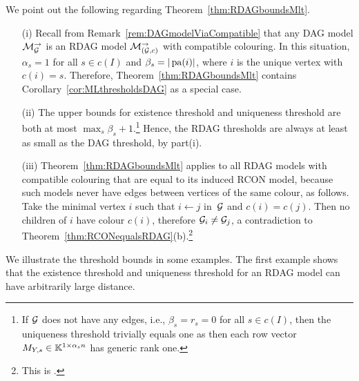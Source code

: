 \begin{remark} We point out the following regarding Theorem~\ref{thm:RDAGboundsMlt}.
	\begin{itemize}
		\item[(i)] Recall from Remark~\ref{rem:DAGmodelViaCompatible} that any DAG model $\mathcal{M}_{\mathcal{G}}^{\to}$ is an RDAG model $\mathcal{M}_{(\mathcal{G}, c)}^{\to}$ with compatible colouring. In this situation, $\alpha_s = 1$ for all $s \in c(I)$ and $\beta_s = |\operatorname{pa}(i)|$, where $i$ is the unique vertex with $c(i) = s$. Therefore, Theorem~\ref{thm:RDAGboundsMlt} contains Corollary~\ref{cor:MLthresholdsDAG} as a special case.
		
		\item[(ii)] The upper bounds for existence threshold and uniqueness threshold are both at most $\max_s \beta_s +1$.\footnote{If $\mathcal{G}$ does not have any edges, i.e., $\beta_s = r_s = 0$ for all $s \in c(I)$, then the uniqueness threshold trivially equals one as then each row vector $M_{Y,s} \in \mathbb K^{1 \times \alpha_s n}$ has generic rank one.} Hence, the RDAG thresholds are always at least as small as the DAG threshold, by part(i).
		
		\item[(iii)] \label{rmk:no_edges_same_colour}
		Theorem~\ref{thm:RDAGboundsMlt} applies to all RDAG models with compatible colouring that are equal to its induced RCON model, because such models never have edges between vertices of the same colour, as follows.
		Take the minimal vertex $i$ such that $i \leftarrow j$ in~$\mathcal{G}$ and $c(i) = c(j)$. Then no children of $i$ have colour $c(i)$, therefore $\mathcal{G}_i \neq \mathcal{G}_j$, a contradiction to Theorem~\ref{thm:RCONequalsRDAG}(b).\footnote{This is \cite[Remark~5.6]{RDAG}.}
		\hfill\remSymbol
	\end{itemize}
\end{remark}

We illustrate the threshold bounds in some examples. The first example shows that the existence threshold and uniqueness threshold for an RDAG model can have arbitrarily large distance.

